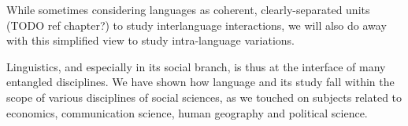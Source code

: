 \documentclass[../thesis.tex]{subfiles}
\begin{document}
While sometimes
considering languages as coherent, clearly-separated units (TODO ref chapter?) to study interlanguage interactions, we will also do away with this simplified view to study intra-language variations.

Linguistics, and especially in its social branch, is thus at the interface of many entangled disciplines. We have shown how language and its study fall within the scope of various disciplines of social sciences, as we touched on subjects related to economics, communication science, human geography and political science.   

\cite{LabovPrinciplesLinguistic1994,LabovPrinciplesLinguistic2001,LabovPrinciplesLinguistic2010}
\end{document}
